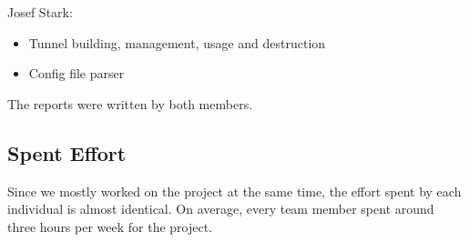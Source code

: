 \documentclass{article}
\begin{document}
Josef Stark:
\begin{itemize}
	\item Tunnel building, management, usage and destruction
	\item Config file parser \\
\end{itemize}
The reports were written by both members.


\subsection{Spent Effort}
Since we mostly worked on the project at the same time, the effort spent by each individual is
almost identical. On average, every team member spent around three hours per week for the project.

\noindent
\end{document}
